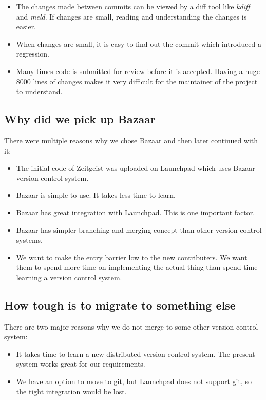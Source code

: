 \begin{itemize}
\item The changes made between commits can be viewed by a diff tool like \textit{kdiff} and \textit{meld}. 
If changes are small, reading and understanding the changes is easier.
\item When changes are small, it is easy to find out the commit which introduced a regression.
\item Many times code is submitted for review before it is accepted. Having a huge 8000 lines 
of changes makes it very difficult for the maintainer of the project to understand.
\end{itemize}

\subsection{Why did we pick up Bazaar}
There were multiple reasons why we chose Bazaar and then later continued with it: 
\begin{itemize}
\item The initial code of Zeitgeist was uploaded on Launchpad which uses Bazaar version control system.
\item Bazaar is simple to use. It takes less time to learn.
\item Bazaar has great integration with Launchpad. This is one important factor.
\item Bazaar has simpler branching and merging concept than other version control systems.
\item We want to make the entry barrier low to the new contributers. We want them to spend more time 
on implementing the actual thing than spend time learning a version control system.
\end{itemize}

\subsection{How tough is to migrate to something else}
There are two major reasons why we do not merge to some other version control system: 
\begin{itemize}
\item It takes time to learn a new distributed version control system. The present system works 
great for our requirements.
\item We have an option to move to git, but Launchpad does not support git, so the tight 
integration would be lost.
\end{itemize}


